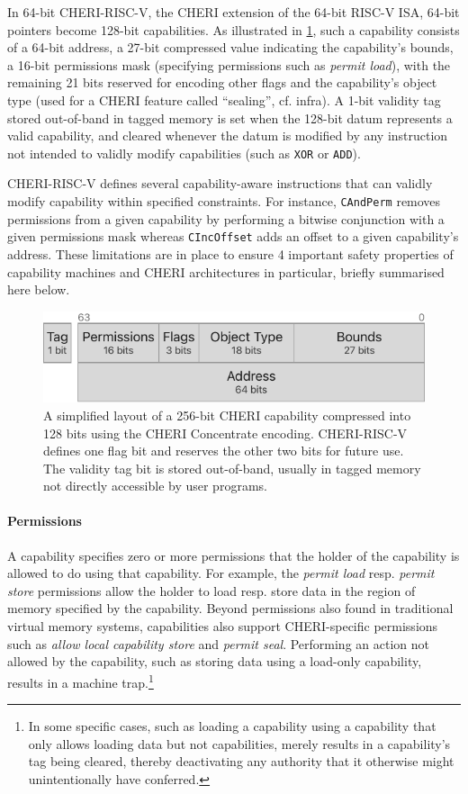\documentclass[main.tex]{subfiles}
\begin{document}
In 64-bit CHERI-RISC-V, the CHERI extension of the 64-bit RISC-V ISA, 64-bit pointers become 128-bit capabilities. As illustrated in \cref{fig:chericoncentrate}, such a capability consists of a 64-bit address, a 27-bit compressed value indicating the capability’s bounds, a 16-bit permissions mask (specifying permissions such as \emph{permit load}), with the remaining 21 bits reserved for encoding other flags and the capability’s object type (used for a CHERI feature called \enquote{\gls*{sealing}}, cf. infra). A 1-bit validity tag stored out-of-band in tagged memory is set when the 128-bit datum represents a valid capability, and cleared whenever the datum is modified by any instruction not intended to validly modify capabilities (such as \texttt{XOR} or \texttt{ADD}).

CHERI-RISC-V defines several capability-aware instructions that can validly modify capability within specified constraints. For instance, \texttt{CAndPerm} removes permissions from a given capability by performing a bitwise conjunction with a given permissions mask whereas \texttt{CIncOffset} adds an offset to a given capability's address. These limitations are in place to ensure 4 important safety properties of capability machines and CHERI architectures in particular, briefly summarised here below.

\begin{figure}
	\centering
	\includegraphics{Images/CHERI Concentrate Layout.pdf}
	\caption{A simplified layout of a 256-bit CHERI capability compressed into 128 bits using the CHERI Concentrate encoding. CHERI-RISC-V defines one flag bit and reserves the other two bits for future use. The validity tag bit is stored out-of-band, usually in tagged memory not directly accessible by user programs.}
	\label{fig:chericoncentrate}
\end{figure}

\paragraph{Permissions} A capability specifies zero or more permissions that the holder of the capability is allowed to do using that capability. For example, the \emph{permit load} resp. \emph{permit store} permissions allow the holder to load resp. store data in the region of memory specified by the capability. Beyond permissions also found in traditional virtual memory systems, capabilities also support CHERI-specific permissions such as \emph{allow local capability store} and \emph{permit seal}. Performing an action not allowed by the capability, such as storing data using a load-only capability, results in a machine trap.\footnote{In some specific cases, such as loading a capability using a capability that only allows loading data but not capabilities, merely results in a capability's tag being cleared, thereby deactivating any authority that it otherwise might unintentionally have conferred.}
\end{document}
